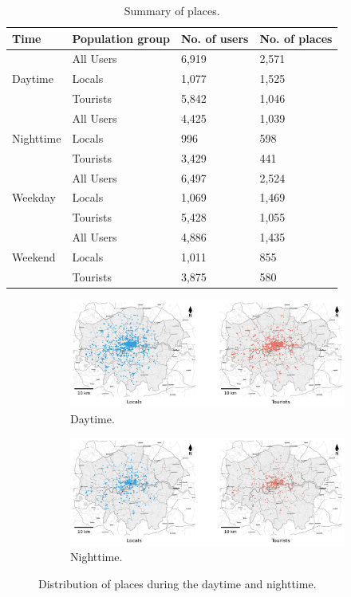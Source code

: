 \documentclass{article}
\theoremstyle{definition}
\theoremstyle{remark}
\begin{document}
\begin{table}[h!]
\centering
\caption{\label{tab:places_summary}Summary of places.}
\begin{tabular}{llll} \hline
Time & Population group & No. of users & No. of places \\
\hline
\multirow{3}{*}{Daytime} 
& All Users & 6,919 & 2,571 \\
& Locals & 1,077 & 1,525 \\
& Tourists & 5,842 & 1,046 \\
\hline
\multirow{3}{*}{Nighttime} 
& All Users & 4,425 & 1,039 \\
& Locals & 996 & 598 \\
& Tourists & 3,429 & 441 \\
\hline
\multirow{3}{*}{Weekday} 
& All Users & 6,497 & 2,524 \\
& Locals & 1,069 & 1,469 \\
& Tourists & 5,428 & 1,055 \\
\hline
\multirow{3}{*}{Weekend} 
& All Users & 4,886 & 1,435 \\
& Locals & 1,011 & 855 \\
& Tourists & 3,875 & 580 \\
\hline
\end{tabular}
\end{table}


\begin{figure}[!h]

\centering
\begin{subfigure}{0.6\textheight}
\centering
\includegraphics[width=0.9\linewidth]{figures/places_daytime.png} 
\caption{Daytime.}
\label{fig:places_daytime}
\end{subfigure}
\begin{subfigure}{0.6\textheight}
\centering
\includegraphics[width=0.9\linewidth]{figures/places_nighttime.png}
\caption{Nighttime.}
\label{fig:places_nighttime}
\end{subfigure}

\caption{Distribution of places during the daytime and nighttime.}
\label{fig:places_distribution_day}
\end{figure}
\end{document}
